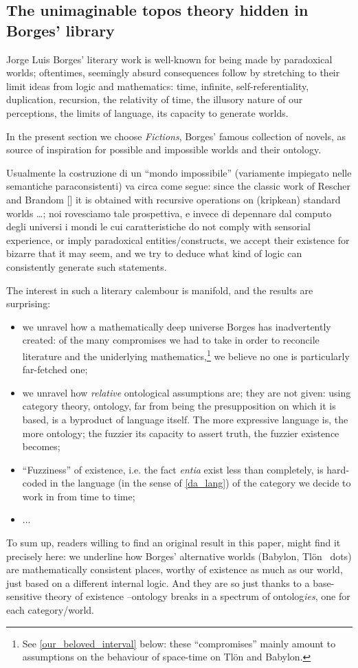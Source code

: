 \subsection{The unimaginable topos theory hidden in Borges' library}
Jorge Luis Borges' literary work is well-known for being made by paradoxical worlds; oftentimes, seemingly absurd consequences follow by stretching to their limit ideas from logic and mathematics: time, infinite, self-referentiality, duplication, recursion, the relativity of time, the illusory nature of our perceptions, the limits of language, its capacity to generate worlds.

In the present section we choose \emph{Fictions}, Borges' famous collection of novels, as source of inspiration for possible and impossible worlds and their ontology.

Usualmente la costruzione di un ``mondo impossibile'' (variamente impiegato nelle semantiche paraconsistenti) va circa come segue: since the classic work of Rescher and Brandom [\cite{??}] it is obtained with recursive operations on (kripkean) standard worlds \dots ; noi rovesciamo tale prospettiva, e invece di depennare dal computo degli universi i mondi le cui caratteristiche do not comply with sensorial experience, or imply paradoxical entities/constructs, we accept their existence for bizarre that it may seem, and we try to deduce what kind of logic can consistently generate such statements.

The interest in such a literary calembour is manifold, and the results are surprising:
\begin{itemize}
	\item we unravel how a mathematically deep universe Borges has inadvertently created: of the many compromises we had to take in order to reconcile literature and the uniderlying mathematics,\footnote{See \autoref{our_beloved_interval} below: these ``compromises'' mainly amount to assumptions on the behaviour of space-time on Tl\"on and Babylon.} we believe no one is particularly far-fetched one;
	\item we unravel how \emph{relative} ontological assumptions are; they are not given: using category theory, ontology, far from being the presupposition on which it is based, is a byproduct of language itself. The more expressive language is, the more ontology; the fuzzier its capacity to assert truth, the fuzzier existence becomes;
	\item ``Fuzziness'' of existence, i.e. the fact \emph{entia} exist less than completely, is hard-coded in the language (in the sense of \autoref{da_lang}) of the category we decide to work in from time to time;
	\item ...
\end{itemize}
To sum up, readers willing to find an original result in this paper, might find it precisely here: we underline how Borges' alternative worlds (Babylon, Tl\"on \ dots) are mathematically consistent places, worthy of existence as much as our world, just based on a different internal logic. And they are so just thanks to a base-sensitive theory of existence --ontology breaks in a spectrum of ontolog\emph{ies}, one for each category/world.

